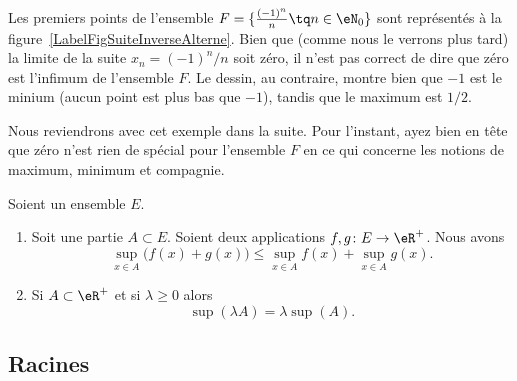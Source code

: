 \begin{example}
	Les premiers points de l'ensemble \( F=\{ \frac{ (-1)^n }{ n }\tq n\in\eN_0 \}\) sont représentés à la figure~\ref{LabelFigSuiteInverseAlterne}. Bien que (comme nous le verrons plus tard) la limite de la suite \( x_n=(-1)^n/n\) soit zéro, il n'est pas correct de dire que zéro est l'infimum de l'ensemble \( F\). Le dessin, au contraire, montre bien que \( -1\) est le minium (aucun point est plus bas que \( -1\)), tandis que le maximum est \( 1/2\).

	Nous reviendrons avec cet exemple dans la suite. Pour l'instant, ayez bien en tête que zéro n'est rien de spécial pour l'ensemble \( F\) en ce qui concerne les notions de maximum, minimum et compagnie.
\end{example}
\newcommand{\CaptionFigSuiteInverseAlterne}{Les quelques premiers points du type \( (-1)^n/n\).}


\begin{proposition}	\label{PROPooQULXooVzUtAi}
	Soient un ensemble \( E\).
	\begin{enumerate}
		\item		\label{ITEMooBOMOooTDUpgb}
		      Soit une partie \( A\subset E\). Soient deux applications \(f,g \colon E\to \eR^+  \). Nous avons
		      \begin{equation}
			      \sup_{x\in A}\big( f(x)+g(x) \big)\leq\sup_{x\in A}f(x)+\sup_{x\in A}g(x).
		      \end{equation}
		\item		\label{ITEMooMWCRooSqwXgN}
		      Si \( A\subset \eR^+\) et si \( \lambda\geq 0\) alors
		      \begin{equation}
			      \sup(\lambda A)=\lambda\sup(A).
		      \end{equation}
	\end{enumerate}
\end{proposition}



\subsection{Racines}
\label{SUBSECooMBCNooEqjjTY}

